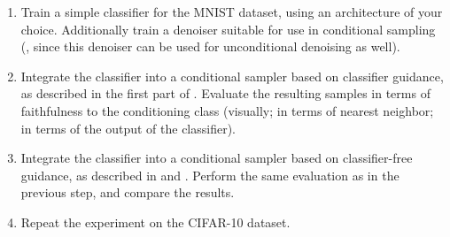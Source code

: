 \documentclass[../../book-main.tex]{subfiles}
\begin{document}
\begin{exercise}
    \begin{enumerate}
        \item Train a simple classifier for the MNIST dataset, using
            an architecture
            of your choice. Additionally train a denoiser suitable for use in
            conditional sampling
            (,
                since this denoiser can be used for unconditional
            denoising as well).
        \item Integrate the classifier into a conditional sampler based on
            classifier guidance, as described in the first part of
            .
            Evaluate the resulting samples in terms of faithfulness to the
            conditioning class (visually; in terms of nearest
                neighbor; in terms of
            the output of the classifier).
        \item Integrate the classifier into a conditional sampler based on
            classifier-free guidance, as described in  and
            . Perform the same
            evaluation as in the previous step, and compare the results.
        \item Repeat the experiment on the CIFAR-10 dataset.
    \end{enumerate}

\end{exercise}
\end{document}
